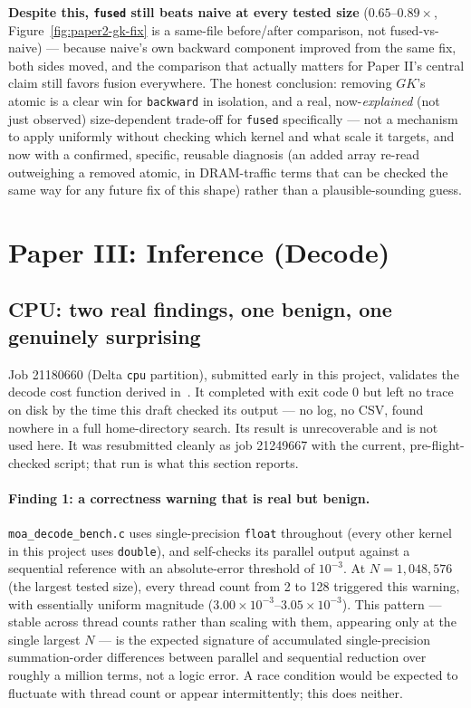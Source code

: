 \documentclass[11pt]{article}
\begin{document}
\textbf{Despite this, \texttt{fused} still beats naive at every tested
size} ($0.65$--$0.89\times$, Figure~\ref{fig:paper2-gk-fix} is a
same-file before/after comparison, not fused-vs-naive) --- because
naive's own backward component improved from the same fix, both sides
moved, and the comparison that actually matters for Paper II's central
claim still favors fusion everywhere. The honest conclusion: removing
$GK$'s atomic is a clear win for \texttt{backward} in isolation, and a
real, now-\emph{explained} (not just observed) size-dependent trade-off
for \texttt{fused} specifically --- not a mechanism to apply uniformly
without checking which kernel and what scale it targets, and now with
a confirmed, specific, reusable diagnosis (an added array re-read
outweighing a removed atomic, in DRAM-traffic terms that can be
checked the same way for any future fix of this shape) rather than a
plausible-sounding guess.

\section{Paper III: Inference (Decode)}
\label{sec:paper3}

\subsection{CPU: two real findings, one benign, one genuinely surprising}
\label{sec:paper3-cpu}

Job 21180660 (Delta \texttt{cpu} partition), submitted early in this
project, validates the decode cost function derived in~\cite{paper3}.
It completed with exit code 0 but left no trace on disk by the
time this draft checked its output --- no log, no CSV, found nowhere
in a full home-directory search. Its result is unrecoverable and is
not used here. It was resubmitted cleanly as job 21249667 with the
current, pre-flight-checked script; that run is what this section
reports.

\paragraph{Finding 1: a correctness warning that is real but benign.}
\texttt{moa\_decode\_bench.c} uses single-precision \texttt{float}
throughout (every other kernel in this project uses \texttt{double}),
and self-checks its parallel output against a sequential reference with
an absolute-error threshold of $10^{-3}$. At $N=1{,}048{,}576$ (the
largest tested size), every thread count from 2 to 128 triggered this
warning, with essentially uniform magnitude
($3.00\times10^{-3}$--$3.05\times10^{-3}$). This pattern --- stable
across thread counts rather than scaling with them, appearing only at
the single largest $N$ --- is the expected signature of accumulated
single-precision summation-order differences between parallel and
sequential reduction over roughly a million terms, not a logic error.
A race condition would be expected to fluctuate with thread count or
appear intermittently; this does neither.
\end{document}
